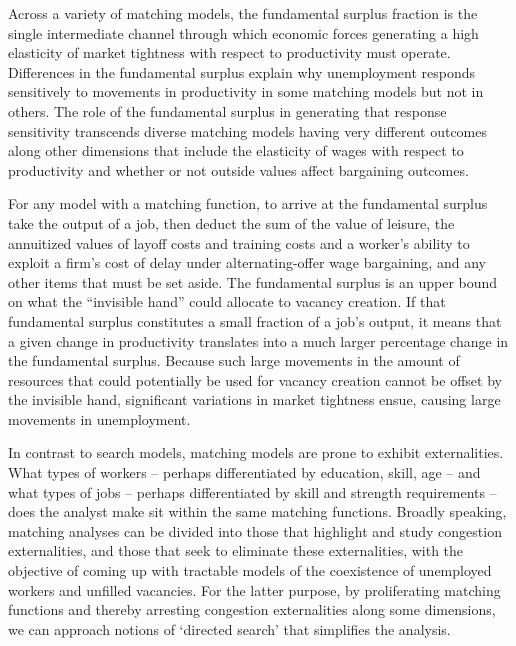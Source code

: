 Across a variety of matching models, the fundamental surplus fraction is the
single intermediate channel through which economic forces
generating a high elasticity of market tightness with
respect to productivity must operate.  Differences in the  fundamental surplus
explain  why unemployment responds sensitively to
movements in productivity in some matching models but not in
others. The role of the fundamental surplus in generating that response sensitivity
transcends diverse matching models having
very different outcomes along other dimensions that include the elasticity of
wages with respect to productivity %
and
whether or not outside values affect bargaining outcomes.




For any model with a matching function,  to arrive at the fundamental surplus take the output of a job, then deduct the
sum of the value of leisure,
the annuitized values of layoff costs and training costs and a worker's
ability to exploit a firm's cost of delay under
alternating-offer wage bargaining, and  any other items that must
be set aside. The fundamental surplus is an
upper bound on what the ``invisible hand'' could allocate
to vacancy creation. If that fundamental surplus constitutes
a small fraction of a job's output, it means that a given change
in productivity translates into a  much larger percentage
change in the fundamental surplus. Because such large movements in the
amount of resources that could potentially be used for vacancy
creation cannot be offset by the invisible hand,
significant variations in market tightness ensue,  causing large
movements in unemployment.

In contrast to search models, matching models are prone to
exhibit externalities. What types of workers -- perhaps
differentiated by education, skill, age -- and what types of jobs
-- perhaps differentiated by skill and strength requirements --
does the analyst make sit within the same matching functions.
Broadly speaking, matching analyses can be divided into those
that highlight and study congestion externalities, and those that
seek to eliminate these externalities, with the objective of
coming up with tractable models of the coexistence of unemployed
workers and unfilled vacancies. For the latter purpose, by
proliferating matching functions and thereby arresting congestion
externalities along some dimensions, we can approach notions of
`directed search' that simplifies the analysis.





